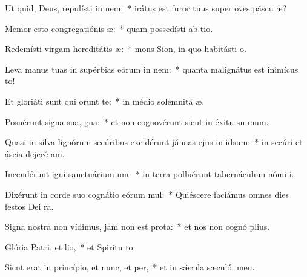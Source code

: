 \item Ut quid, Deus, repulísti in nem:~* irátus est furor tuus super oves páscu æ?
\item Memor esto congregatiónis æ:~* quam possedísti ab tio.
\item Redemísti virgam hereditátis æ:~* mons Sion, in quo habitásti  o.
\item Leva manus tuas in supérbias eórum in nem:~* quanta malignátus est inimícus  to!
\item Et gloriáti sunt qui orunt te:~* in médio solemnitá æ.
\item Posuérunt signa sua, gna:~* et non cognovérunt sicut in éxitu su mum.
\item Quasi in silva lignórum secúribus excidérunt jánuas ejus in idsum:~* in secúri et áscia dejecé am.
\item Incendérunt igni sanctuárium um:~* in terra polluérunt tabernáculum nómi i.
\item Dixérunt in corde suo cognátio eórum mul:~* Quiéscere faciámus omnes dies festos Dei  ra.
\item Signa nostra non vídimus, jam non est prota:~* et nos non cognó plius.
\item Glória Patri, et lio,~* et Spirítu to.
\item Sicut erat in princípio, et nunc, et per,~* et in sǽcula sæculó. men.
